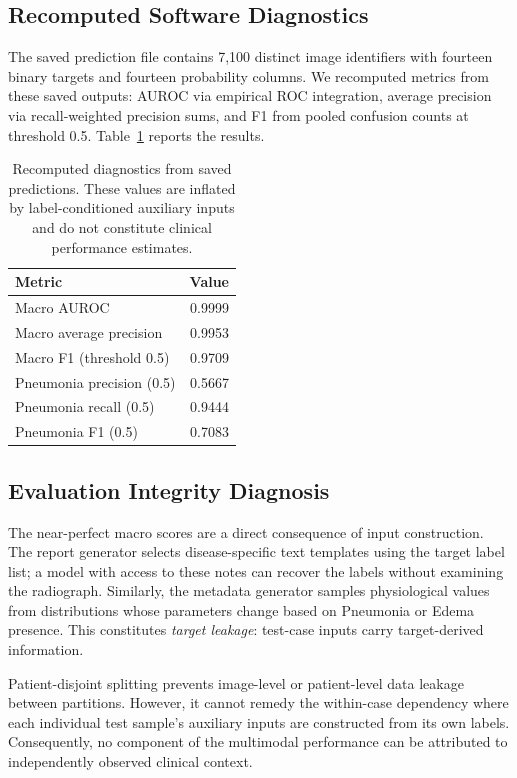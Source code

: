 \documentclass[runningheads,a4paper]{llncs}
\begin{document}
\subsection{Recomputed Software Diagnostics}

The saved prediction file contains 7{,}100 distinct image identifiers with fourteen binary targets and fourteen probability columns.
We recomputed metrics from these saved outputs: AUROC via empirical ROC integration, average precision via recall-weighted precision sums, and F1 from pooled confusion counts at threshold 0.5.
Table~\ref{tab:diagnostics} reports the results.

\begin{table}[t]
\caption{Recomputed diagnostics from saved predictions. These values are inflated by label-conditioned auxiliary inputs and do not constitute clinical performance estimates.}
\label{tab:diagnostics}
\centering
\begin{tabular}{lr}
\toprule
Metric & Value\\
\midrule
Macro AUROC & 0.9999\\
Macro average precision & 0.9953\\
Macro F1 (threshold 0.5) & 0.9709\\
Pneumonia precision (0.5) & 0.5667\\
Pneumonia recall (0.5) & 0.9444\\
Pneumonia F1 (0.5) & 0.7083\\
\bottomrule
\end{tabular}
\end{table}

\subsection{Evaluation Integrity Diagnosis}
\label{sec:integrity}

The near-perfect macro scores are a direct consequence of input construction.
The report generator selects disease-specific text templates using the target label list; a model with access to these notes can recover the labels without examining the radiograph.
Similarly, the metadata generator samples physiological values from distributions whose parameters change based on Pneumonia or Edema presence.
This constitutes \emph{target leakage}: test-case inputs carry target-derived information.

Patient-disjoint splitting prevents image-level or patient-level data leakage between partitions.
However, it cannot remedy the within-case dependency where each individual test sample's auxiliary inputs are constructed from its own labels.
Consequently, no component of the multimodal performance can be attributed to independently observed clinical context.
\end{document}
